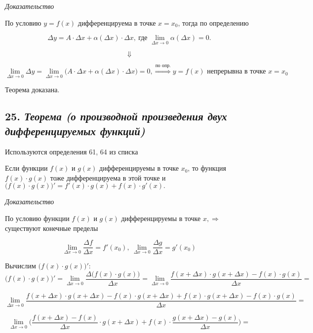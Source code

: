 \textit{Доказательство}

По условию $y = f(x)$ дифференцируема в точке $x = x_0$, тогда по определению

$$
\Delta y = A \cdot \Delta x + \alpha(\Delta x)\cdot \Delta x, \ \text{где } \lim\limits_{\Delta x \rightarrow 0}\alpha(\Delta x) = 0. 
$$

$$\Downarrow $$

$$
\lim\limits_{\Delta x \rightarrow 0}\Delta y = \lim\limits_{\Delta x \rightarrow 0}\big(A \cdot \Delta x + \alpha(\Delta x)\cdot \Delta x \big) = 0, \overset{\text{по опр.}}{\Rightarrow} y = f(x) \text{ непрерывна в точке } x = x_0
$$

Теорема доказана.
\newpage 
\subsection*{25. \textit{Теорема (о производной произведения двух дифференцируемых функций)}}
\begin{Quote2} 
\small\centering 

Используются определения 61, 64 из списка \end{Quote2} 

Если функции $f(x)$ и $g(x)$ дифференцируемы в точке $x_0$, то функция $f(x)\cdot g(x)$ тоже дифференцируема в этой точке и $\big(f(x)\cdot g(x)\big)' = f'(x)\cdot g(x) + f(x)\cdot g'(x).$
\vspace*{20pt} 

\textit{Доказательство}

По условию функции $f(x)$ и $g(x)$ дифференцируемы в точке $x, \Rightarrow$ существуют конечные пределы

$$
\lim\limits_{\Delta x \rightarrow 0}\dfrac{\Delta f}{\Delta x} = f'(x_0), \ \lim\limits_{\Delta x \rightarrow 0}\dfrac{\Delta g}{\Delta x} = g'(x_0)
$$

Вычислим $\big(f(x)\cdot g(x)\big)':$ $$
\big(f(x)\cdot g(x)\big)' 
= \lim\limits_{\Delta x \rightarrow 0}{\dfrac{\Delta \big(f(x)\cdot g(x)\big)}{\Delta x}} 
= \lim\limits_{\Delta x \rightarrow 0}{\dfrac{f(x + \Delta x)\cdot g(x + \Delta x) - f(x)\cdot g(x)}{\Delta x}} 
= 
$$

$$
\lim\limits_{\Delta x \rightarrow 0}{\dfrac{f(x + \Delta x)\cdot g(x + \Delta x) - f(x)\cdot g(x + \Delta x) + f(x)\cdot g(x + \Delta x) - f(x)\cdot g(x)}{\Delta x}} 
=
$$

$$
\lim\limits_{\Delta x \rightarrow 0}\bigg(\dfrac{f(x + \Delta x)- f(x)}{\Delta x}\cdot g(x + \Delta x) + f(x)\cdot \dfrac{g(x + \Delta x)- g(x)}{\Delta x}\bigg) 
=
$$


